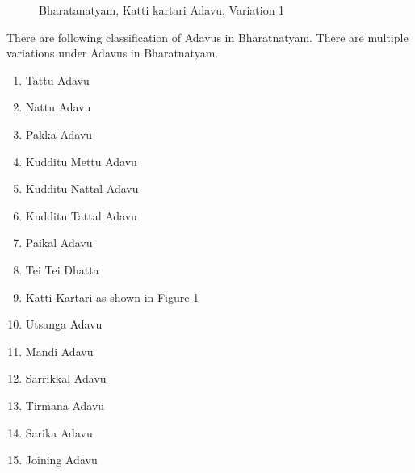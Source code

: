  \begin{figure}
    \centering
    \caption{(a) Dancer 1 (b) Dancer 2 (c) Dancer 3}
    \caption{Bharatanatyam, Katti kartari Adavu, Variation 1}
    \label{fig:Ch01001}
\end{figure}

There are following classification of Adavus in Bharatnatyam. There are multiple variations under Adavus in Bharatnatyam.
\begin{enumerate}
    \item Tattu Adavu
    \item Nattu Adavu
    \item Pakka Adavu
    \item Kudditu Mettu Adavu
    \item Kudditu Nattal Adavu
    \item Kudditu Tattal Adavu
    \item Paikal Adavu
    \item Tei Tei Dhatta
    \item Katti Kartari as shown in Figure \ref{fig:Ch01001}
    \item Utsanga Adavu
    \item Mandi Adavu
    \item Sarrikkal Adavu
    \item Tirmana Adavu
    \item Sarika Adavu
    \item Joining Adavu
\end{enumerate}

